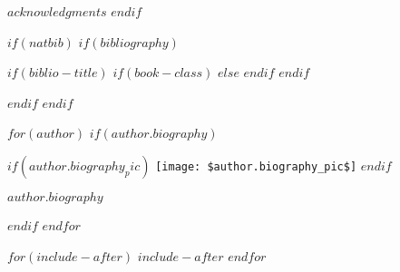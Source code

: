 \documentclass[webpdf$if(papersize)$,$papersize$$else$,large$endif$$if(document_style)$,$document_style$$else$,contemporary$endif$$if(numbersections)$$else$,unnumsec$endif$$if(namedate)$,namedate$endif$$if(classoptions)$,$for(classoptions)$$classoptions$$sep$,$endfor$$endif$]{oup-authoring-template}
\theoremstyle{thmstyleone}%
\theoremstyle{thmstyletwo}%
\theoremstyle{thmstylethree}%
\begin{document}
$acknowledgments$
$endif$

$if(natbib)$
$if(bibliography)$

$if(biblio-title)$
$if(book-class)$
\renewcommand\bibname{$biblio-title$}
$else$
\renewcommand\refname{$biblio-title$}
$endif$
$endif$



$endif$
$endif$

$for(author)$
$if(author.biography)$
\begin{biography}{%
$if(author.biography_pic)$
\texttt{[image: \$author.biography\_pic\$]}%
$endif$%
}{\author{$author.name$} $author.biography$}
\end{biography}
$endif$
$endfor$

$for(include-after)$
$include-after$
$endfor$
\end{document}
